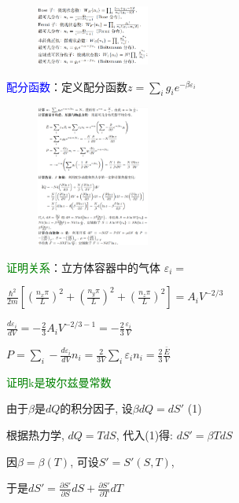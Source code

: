 \documentclass[a4paper,8pt]{extarticle} %
\newcommand{\bluetext}[1]{\textcolor{blue}{#1}}
\newcommand{\greentext}[1]{\textcolor{green}{#1}}
\begin{document}
\begin{multicols}{3}
\begin{figure}[H]
    \vspace{-0.3cm}
    \centering
    \includegraphics[width=0.33\textwidth]{images/1.png}
    \vspace{-0.6cm}
\end{figure}

\bluetext{配分函数}：定义配分函数$z=\sum_i g_i e^{-\beta\varepsilon_i}$

\begin{figure}[H]
    \vspace{-0.3cm}
    \centering
    \includegraphics[width=0.33\textwidth]{images/2.png}
    \vspace{-0.6cm}
\end{figure}

\greentext{证明关系}：立方体容器中的气体
$\varepsilon_i = $

$\frac{\hbar^2}{2m}\left[\left(\frac{n_x\pi}{L}\right)^2 + \left(\frac{n_y\pi}{L}\right)^2 + \left(\frac{n_z\pi}{L}\right)^2\right] = A_iV^{-2/3}$

$\frac{d\varepsilon_i}{dV} = -\frac{2}{3}A_iV^{-2/3-1} = -\frac{2}{3}\frac{\varepsilon_i}{V}$

$P = \sum_i -\frac{d\varepsilon_i}{dV}n_i = \frac{2}{3V}\sum_i\varepsilon_in_i = \frac{2}{3}\frac{\bar{E}}{V}$

\greentext{证明k是玻尔兹曼常数}

由于$\beta$是$dQ$的积分因子, 设$\beta dQ = dS'$ (1)

根据热力学, $dQ = TdS$, 代入(1)得:
$dS' = \beta TdS$

因$\beta = \beta(T)$, 可设$S' = S'(S,T)$,

于是$dS' = \frac{\partial S'}{\partial S}dS + \frac{\partial S'}{\partial T}dT$


\end{multicols}
\end{document}
